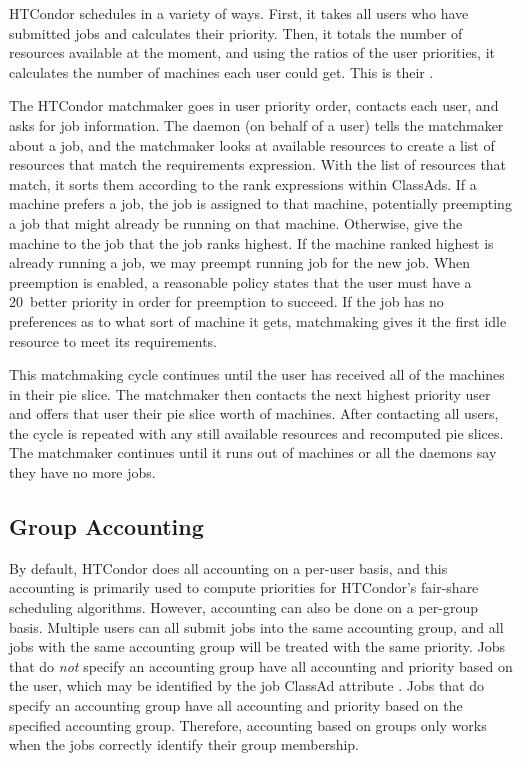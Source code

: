 HTCondor schedules in a variety of ways.
First, it takes all users who have submitted jobs and calculates their priority.
Then, it totals the number of resources available at the moment,
and using the ratios of the user priorities,
it calculates the number of machines each user could get.
This is their .

The HTCondor matchmaker goes in user priority order, 
contacts each user, and asks for job information. 
The  daemon (on behalf of a user)
tells the matchmaker about a job,
and the matchmaker looks at available resources
to create a list of resources that match the requirements expression.
With the list of resources that match,
it sorts them according to the rank expressions within ClassAds.
If a machine prefers a job, the job is assigned to that machine,
potentially preempting a job that might already be running on that machine.
Otherwise, give the machine to the job that the job ranks highest.
If the machine ranked highest is already running a job,
we may preempt running job
for the new job. 
When preemption is enabled,
a reasonable policy states that the user must
have a 20\Percent\  better priority in order for preemption to succeed.
If the job has no preferences as to what sort of machine it gets,
matchmaking gives it the first idle resource to meet its requirements.

This matchmaking cycle continues until the user has received all of the
machines in their pie slice.
The matchmaker then contacts the next highest
priority user and offers that user their pie slice worth of machines.
After contacting all users,
the cycle is repeated with any still available resources
and recomputed pie slices.
The matchmaker continues  
until it runs out of machines or all the  daemons
say they have no more jobs. 

\subsection{\label{sec:group-accounting}Group Accounting}

By default, HTCondor does all accounting on a per-user basis, and this
accounting is primarily used to compute priorities for HTCondor's
fair-share scheduling algorithms. 
However, accounting can also be done on a per-group basis.
Multiple users can all submit jobs into the same accounting group,
and all jobs with the same accounting group
will be treated with the same priority.
Jobs that do \emph{not} specify an accounting group have 
all accounting and priority based on the user, 
which may be identified by the job ClassAd attribute .
Jobs that do specify an accounting group have 
all accounting and priority based on the specified accounting group.
Therefore, accounting based on groups only works when
the jobs correctly identify their group membership.

